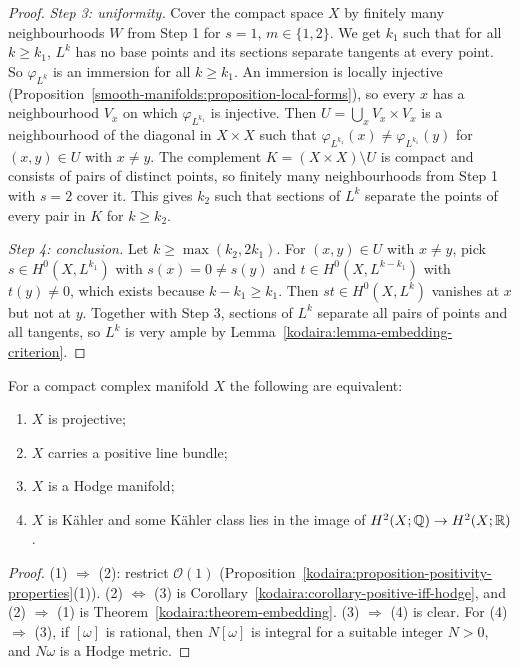 \begin{proof}
\emph{Step 3: uniformity.} Cover the compact space $X$ by finitely many neighbourhoods $W$ from Step 1 for $s = 1$, $m \in \{1, 2\}$. We get $k_1$
such that for all $k \geq k_1$, $L^k$ has no base points and its sections separate tangents at every point. So $\varphi_{L^k}$ is an immersion for all
$k \geq k_1$. An immersion is locally injective (Proposition~\ref{smooth-manifolds:proposition-local-forms}), so every $x$ has a neighbourhood $V_x$ on
which $\varphi_{L^{k_1}}$ is injective. Then $U = \bigcup_xV_x \times V_x$ is a neighbourhood of the diagonal in $X \times X$ such that
$\varphi_{L^{k_1}}(x) \neq \varphi_{L^{k_1}}(y)$ for $(x, y) \in U$ with $x \neq y$. The complement $K = (X \times X) \setminus U$ is compact and
consists of pairs of distinct points, so finitely many neighbourhoods from Step 1 with $s = 2$ cover it. This gives $k_2$ such that sections of $L^k$
separate the points of every pair in $K$ for $k \geq k_2$.

\emph{Step 4: conclusion.} Let $k \geq \max(k_2, 2k_1)$. For $(x, y) \in U$ with $x \neq y$, pick $s \in H^0(X, L^{k_1})$ with $s(x) = 0 \neq s(y)$ and
$t \in H^0(X, L^{k - k_1})$ with $t(y) \neq 0$, which exists because $k - k_1 \geq k_1$. Then $st \in H^0(X, L^k)$ vanishes at $x$ but not at $y$.
Together with Step 3, sections of $L^k$ separate all pairs of points and all tangents, so $L^k$ is very ample by
Lemma~\ref{kodaira:lemma-embedding-criterion}.
\end{proof}

\begin{corollary}\label{kodaira:corollary-projective-criterion}
For a compact complex manifold $X$ the following are equivalent:
\begin{enumerate}
\item $X$ is projective;
\item $X$ carries a positive line bundle;
\item $X$ is a Hodge manifold;
\item $X$ is K\"ahler and some K\"ahler class lies in the image of $H^2(X; \mathbb{Q}) \to H^2(X; \mathbb{R})$.
\end{enumerate}
\end{corollary}

\begin{proof}
(1) $\Rightarrow$ (2): restrict $\mathcal{O}(1)$ (Proposition~\ref{kodaira:proposition-positivity-properties}(1)). (2) $\Leftrightarrow$ (3) is
Corollary~\ref{kodaira:corollary-positive-iff-hodge}, and (2) $\Rightarrow$ (1) is Theorem~\ref{kodaira:theorem-embedding}. (3) $\Rightarrow$ (4) is
clear. For (4) $\Rightarrow$ (3), if $[\omega]$ is rational, then $N[\omega]$ is integral for a suitable integer $N > 0$, and $N\omega$ is a Hodge metric.
\end{proof}

